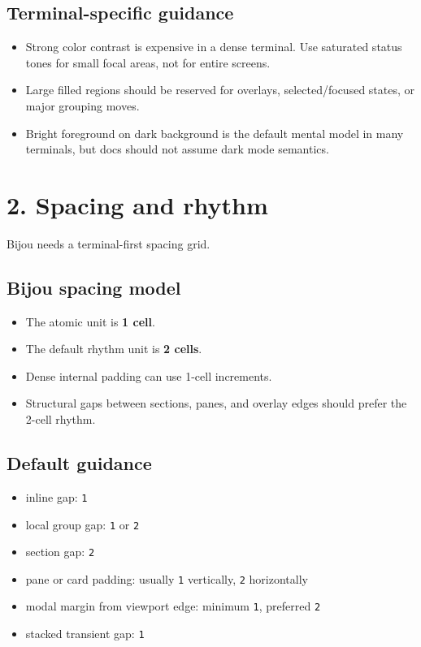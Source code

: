 \subsection{Terminal-specific guidance}\label{record-021-terminal-specific-guidance}

\begin{itemize}
\tightlist
\item
  Strong color contrast is expensive in a dense terminal. Use saturated status tones for small focal areas, not for entire screens.
\item
  Large filled regions should be reserved for overlays, selected/focused states, or major grouping moves.
\item
  Bright foreground on dark background is the default mental model in many terminals, but docs should not assume dark mode semantics.
\end{itemize}

\section{2. Spacing and rhythm}\label{record-021-spacing-and-rhythm}

Bijou needs a terminal-first spacing grid.

\subsection{Bijou spacing model}\label{record-021-bijou-spacing-model}

\begin{itemize}
\tightlist
\item
  The atomic unit is \textbf{1 cell}.
\item
  The default rhythm unit is \textbf{2 cells}.
\item
  Dense internal padding can use 1-cell increments.
\item
  Structural gaps between sections, panes, and overlay edges should prefer the 2-cell rhythm.
\end{itemize}

\subsection{Default guidance}\label{record-021-default-guidance}

\begin{itemize}
\tightlist
\item
  inline gap: \texttt{1}
\item
  local group gap: \texttt{1} or \texttt{2}
\item
  section gap: \texttt{2}
\item
  pane or card padding: usually \texttt{1} vertically, \texttt{2} horizontally
\item
  modal margin from viewport edge: minimum \texttt{1}, preferred \texttt{2}
\item
  stacked transient gap: \texttt{1}
\end{itemize}

